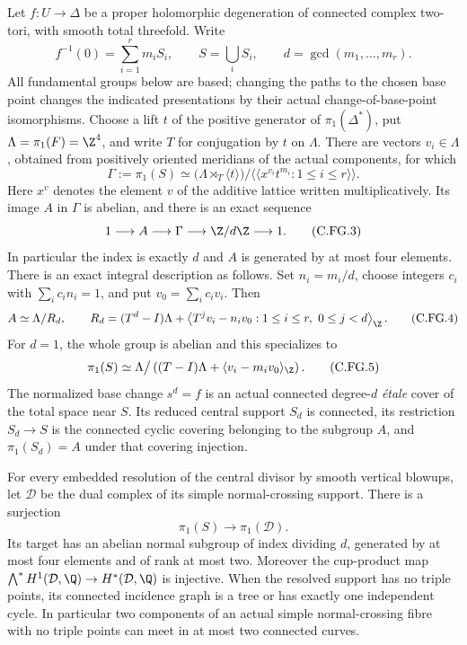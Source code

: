 
\begin{proposition}\label{cdp:st:C.2.UN.44}
Let $f:U\to\Delta$ be a proper holomorphic degeneration of connected
complex two-tori, with smooth total threefold. Write
\[
 f^{-1}(0)=\sum_{i=1}^r m_iS_i,\qquad
 S=\bigcup_iS_i,\qquad d=\gcd(m_1,\ldots,m_r).
                                                        \tag{C.FG.1}\label{cdp:eq:C.FG.1}
\]
All fundamental groups below are based; changing the paths to the
chosen base point changes the indicated presentations by their actual
change-of-base-point isomorphisms. Choose a lift $t$ of the positive
generator of $\pi_1(\Delta^*)$, put $\Lambda=\pi_1(F)=\Z^4$, and
write $T$ for conjugation by $t$ on $\Lambda$. There are vectors
$v_i\in\Lambda$, obtained from positively oriented meridians of the
actual components, for which
\[
 \Gamma:=\pi_1(S)
  \simeq
  \bigl(\Lambda\rtimes_T\langle t\rangle\bigr)
       \big/\langle\!\langle x^{v_i}t^{m_i}:1\le i\le r
                    \rangle\!\rangle .                \tag{C.FG.2}\label{cdp:eq:C.FG.2}
\]
Here $x^v$ denotes the element $v$ of the additive lattice written
multiplicatively. Its image $A$ in $\Gamma$ is abelian, and there is
an exact sequence
\[
       1\longrightarrow A\longrightarrow\Gamma
          \longrightarrow\Z/d\Z\longrightarrow1 .    \tag{C.FG.3}\label{cdp:eq:C.FG.3}
\]
In particular the index is exactly $d$ and $A$ is generated by at most
four elements. There is an exact integral description as follows.
Set $n_i=m_i/d$, choose integers $c_i$ with $\sum_i c_in_i=1$, and
put $v_0=\sum_i c_iv_i$. Then
\[
 A\simeq\Lambda/R_d,\qquad
 R_d=(T^d-I)\Lambda+
       \left\langle T^jv_i-n_iv_0:
                         1\le i\le r,\ 0\le j<d\right\rangle_{\Z}.
                                                        \tag{C.FG.4}\label{cdp:eq:C.FG.4}
\]
For $d=1$, the whole group is abelian and this specializes to
\[
 \pi_1(S)\simeq
   \Lambda\big/\left((T-I)\Lambda+
                   \langle v_i-m_iv_0\rangle_{\Z}\right).
                                                        \tag{C.FG.5}\label{cdp:eq:C.FG.5}
\]
The normalized base change $s^d=f$ is an actual connected degree-$d$
\emph{\'etale} cover of the total space near $S$. Its reduced central
support $S_d$ is connected, its restriction $S_d\to S$ is the
connected cyclic covering belonging to the subgroup $A$, and
$\pi_1(S_d)=A$ under that covering injection.

For every embedded resolution of the central divisor by smooth
vertical blowups, let $\mathcal D$ be the dual complex of its simple
normal-crossing support. There is a surjection
\[
                  \pi_1(S)\longrightarrow\pi_1(\mathcal D).
                                                        \tag{C.FG.6}\label{cdp:eq:C.FG.6}
\]
Its target has an abelian normal subgroup of index dividing $d$,
generated by at most four elements and of rank at most two.
Moreover the cup-product map
$\bigwedge^*H^1(\mathcal D,\Q)\to H^*(\mathcal D,\Q)$ is injective.
When the resolved support has
no triple points, its connected incidence graph is a tree or has
exactly one independent cycle. In particular two components of an
actual simple normal-crossing fibre with no triple points can meet
in at most two connected curves.


\end{proposition}
